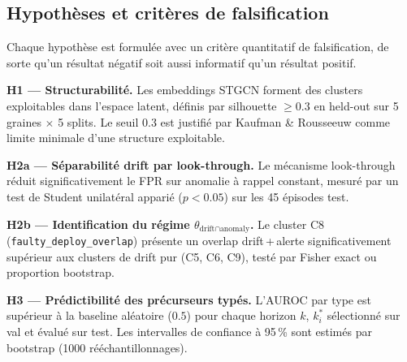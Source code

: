 \subsection{Hypothèses et critères de falsification}
\label{sec:hypotheses}

Chaque hypothèse est formulée avec un critère quantitatif de falsification, de sorte
qu'un résultat négatif soit aussi informatif qu'un résultat positif.

\textbf{H1 --- Structurabilité.}
Les embeddings STGCN forment des clusters exploitables dans l'espace latent,
définis par silhouette $\geq 0.3$ en held-out sur 5 graines $\times$ 5 splits.
Le seuil $0.3$ est justifié par Kaufman \& Rousseeuw \cite{kaufman1990} comme limite
minimale d'une structure exploitable.

\textbf{H2a --- Séparabilité drift par look-through.}
Le mécanisme look-through réduit significativement le FPR sur anomalie à rappel constant,
mesuré par un test de Student unilatéral apparié ($p < 0.05$) sur les 45 épisodes test.

\textbf{H2b --- Identification du régime $\theta_{\text{drift} \cap \text{anomaly}}$.}
Le cluster C8 (\texttt{faulty\_deploy\_overlap}) présente un overlap drift\,+\,alerte
significativement supérieur aux clusters de drift pur (C5, C6, C9),
testé par Fisher exact ou proportion bootstrap.

\textbf{H3 --- Prédictibilité des précurseurs typés.}
L'AUROC par type est supérieur à la baseline aléatoire ($0.5$) pour chaque horizon $k$,
$k^*_i$ sélectionné sur val et évalué sur test.
Les intervalles de confiance à 95\,\% sont estimés par bootstrap (1000 rééchantillonnages).
